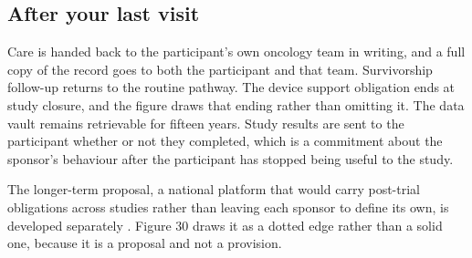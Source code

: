 \vspace{0.30em}

\subsection{After your last visit}

Care is handed back to the participant's own oncology team in writing, and a
full copy of the record goes to both the participant and that team. Survivorship
follow-up returns to the routine pathway. The device support obligation ends at
study closure, and the figure draws that ending rather than omitting it. The data
vault remains retrievable for fifteen years. Study results are sent to the
participant whether or not they completed, which is a commitment about the
sponsor's behaviour after the participant has stopped being useful to the study.

The longer-term proposal, a national platform that would carry post-trial
obligations across studies rather than leaving each sponsor to define its own,
is developed separately \cite{natlpaiplatf}. Figure 30 draws it as a dotted edge
rather than a solid one, because it is a proposal and not a provision.

